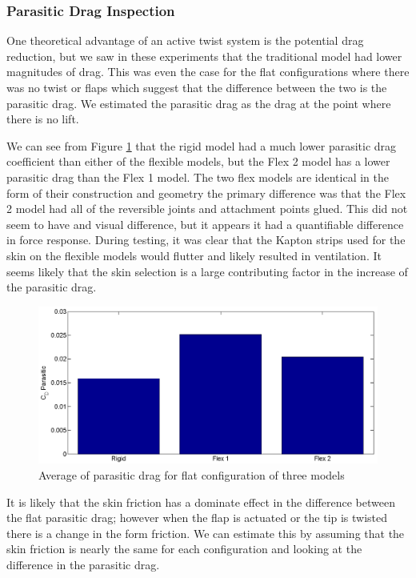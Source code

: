 \documentclass[11pt]{ucthesis}
\begin{document}
\subsubsection{Parasitic Drag Inspection}

One theoretical advantage of an active twist system is the potential drag reduction, but we saw in these experiments that the traditional model had lower magnitudes of drag. This was even the case for the flat configurations where there was no twist or flaps which suggest that the difference between the two is the parasitic drag. We estimated the parasitic drag as the drag at the point where there is no lift.

We can see from Figure \ref{fig:parasitic} that the rigid model had a much lower parasitic drag coefficient than either of the flexible models, but the Flex 2 model has a lower parasitic drag than the Flex 1 model. The two flex models are identical in the form of their construction and geometry the primary difference was that the Flex 2 model had all of the reversible joints and attachment points glued. This did not seem to have and visual difference, but it appears it had a quantifiable difference in force response. During testing, it was clear that the Kapton strips used for the skin on the flexible models would flutter and likely resulted in ventilation. It seems likely that the skin selection is a large contributing factor in the increase of the parasitic drag.

\begin{figure}[thpb]
\centering
\includegraphics[width=.75\linewidth]{Figures/CdPBulkCompare.png}
\caption{Average of parasitic drag for flat configuration of three models}
\label{fig:parasitic}
\end{figure}

It is likely that the skin friction has a dominate effect in the difference between the flat parasitic drag; however when the flap is actuated or the tip is twisted there is a change in the form friction. We can estimate this by assuming that the skin friction is nearly the same for each configuration and looking at the difference in the parasitic drag. 
\end{document}
